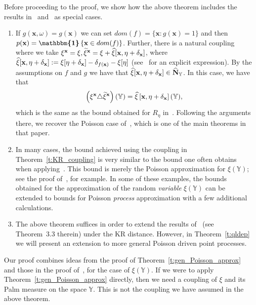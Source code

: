 \documentclass[AHL,Unicode,longabstracts]{cedram}
\newcommand*\bN{\mathbf{N}}
\newcommand{\bx}{\mathbf{x}}
\newcommand*\Y{\mathbb{Y}}
\newcommand*\txi{\tilde{\xi}}
\newcommand{\ind}{\boldsymbol{\mathbbm{1}}}
\newcommand{\set}[1]{\left\{#1\right\}}
\let\oldtilde\tilde
\renewcommand*{\tilde}[1]{\mathchoice{\widetilde{#1}}{\widetilde{#1}}{\oldtilde{#1}}{\oldtilde{#1}}}
\let\oldhat\hat
\renewcommand*{\hat}[1]{\mathchoice{\widehat{#1}}{\widehat{#1}}{\oldhat{#1}}{\oldhat{#1}}}
\begin{document}
\begin{rema}\label{rem:KRcoupling}
Before proceeding to the proof, we show how the above theorem includes the results in~\cite[Theorem~3.1]{penrose_inhomogeneous_2018} and~\cite[Theorem~3.1]{decreusefond_functional_2016} as special cases.
\begin{enumerate}
\item If $g(\bx,\omega) = g(\bx)$ we can set $dom(f) = \{ \bx : g(\bx) = 1\}$ and then $p(\bx) = \ind\set{\bx \in dom(f)}$. Further, there is a natural coupling where we take $\xi^{\bx} = \xi, \txi^{\bx} = \xi + \hat{\xi}[\bx,\eta + \delta_{\bx}]$, where $\hat{\xi}[\bx,\eta+ \delta_{\bx}]:= \xi[\eta + \delta_{\bx}] -\delta_{f(\bx)} - \xi[\eta]$ (see~\cite[(6.2)]{decreusefond_functional_2016} for an explicit expression). By the assumptions on $f$ and $g$ we have that $\hat{\xi}[\bx,\eta+ \delta_{\bx}] \in \widehat{\bN}_{\Y}$. In this case, we have that
\[
\left(\xi^{\bx} \triangle \txi^{\bx}\right)(\Y) = \hat{\xi}\left[\bx,\eta+ \delta_{\bx}\right](\Y),
\]
which is the same as the bound obtained for $R_{\eta}$ in~\cite[page~2172]{decreusefond_functional_2016}. Following the arguments there, we recover the Poisson case of~\cite[Theorem~3.1]{decreusefond_functional_2016}, which is one of the main theorems in that paper.

\item In many cases, the bound achieved using the coupling in Theorem~\ref{t:KR_coupling} is very similar to the bound one often obtains when applying~\cite[Theorem~3.1] {penrose_inhomogeneous_2018}. This bound is merely the Poisson approximation for $\xi(\Y)$; see the proof of~\cite[Theorem~2.8]{Iyer2020}, for example. In some of these examples, the bounds obtained for the approximation of the random \emph{variable} $\xi(\Y)$ can be extended to bounds for Poisson \emph{process} approximation with a few additional calculations.

\item The above theorem suffices in order to extend the results of~\cite{Otto2020} (see Theorem~3.3 therein) under the KR distance. However, in Theorem~\ref{t:qldep} we will present an extension to more general Poisson driven point processes.
\end{enumerate}
\end{rema}

Our proof combines ideas from the proof of Theorem~\ref{t:gen_Poisson_approx} and those in the proof of~\cite[Theorem~3.1]{penrose_inhomogeneous_2018}, for the case of $\xi(\Y)$. If we were to apply Theorem~\ref{t:gen_Poisson_approx} directly, then we need a coupling of $\xi$ and its Palm measure on the space $\Y$. This is not the coupling we have assumed in the above theorem.
\end{document}
